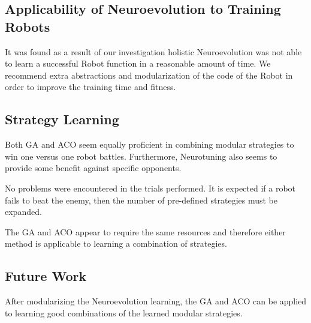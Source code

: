 \subsection{Applicability of Neuroevolution to Training Robots}
It was found as a result of our investigation holistic Neuroevolution was not able to learn a successful Robot function in a reasonable amount of time. We recommend extra abstractions and modularization of the code of the Robot in order to improve the training time and fitness.

\subsection{Strategy Learning}
Both GA and ACO seem equally proficient in combining modular strategies to win one versus one robot battles. Furthermore, Neurotuning also seems to provide some benefit against specific opponents. 

No problems were encountered in the trials performed. It is expected if a robot fails to beat the enemy, then the number of pre-defined strategies must be expanded.

The GA and ACO appear to require the same resources and therefore either method is applicable to learning a combination of strategies.

\subsection{Future Work}
After modularizing the Neuroevolution learning, the GA and ACO can be applied to learning good combinations of the learned modular strategies.
